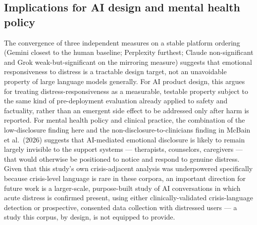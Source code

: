 \documentclass[11pt]{article}
\begin{document}
\subsection{Implications for AI design and mental health policy}

The convergence of three independent measures on a stable platform ordering (Gemini closest to the human baseline; Perplexity furthest; Claude non-significant and Grok weak-but-significant on the mirroring measure) suggests that emotional responsiveness to distress is a tractable design target, not an unavoidable property of large language models generally. For AI product design, this argues for treating distress-responsiveness as a measurable, testable property subject to the same kind of pre-deployment evaluation already applied to safety and factuality, rather than an emergent side effect to be addressed only after harm is reported. For mental health policy and clinical practice, the combination of the low-disclosure finding here and the non-disclosure-to-clinicians finding in McBain et al.\ (2026) suggests that AI-mediated emotional disclosure is likely to remain largely invisible to the support systems --- therapists, counselors, caregivers --- that would otherwise be positioned to notice and respond to genuine distress. Given that this study's own crisis-adjacent analysis was underpowered specifically because crisis-level language is rare in these corpora, an important direction for future work is a larger-scale, purpose-built study of AI conversations in which acute distress is confirmed present, using either clinically-validated crisis-language detection or prospective, consented data collection with distressed users --- a study this corpus, by design, is not equipped to provide.

\end{document}
